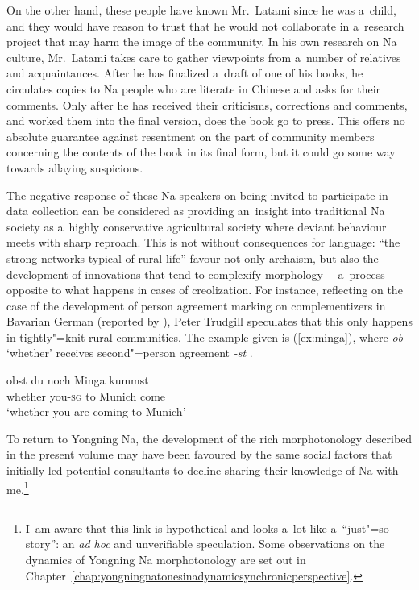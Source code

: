 On the other hand, these people have known Mr.\ Latami since he was a~child, and they would have
reason to trust that he would not collaborate in a~research project that may harm the image of the
community. In his own research on Na culture, Mr.\ Latami takes care to gather
viewpoints from a~number of relatives and acquaintances. After he has
finalized a~draft of one of his books, he circulates copies to Na people who are literate in Chinese and asks for their comments. Only after he
has received their criticisms, corrections and comments, and worked them into the final version,
does the book go to press. This offers no absolute guarantee against resentment on the part of 
community members concerning the contents of the book in its final form, but it could go some way
towards allaying suspicions.

The negative response of these Na speakers on being invited to participate in data collection can be considered as providing an~insight into traditional Na society as a~highly {conservative} agricultural society where deviant behaviour meets with sharp
reproach. This is not without consequences for language: “the strong networks typical of rural life” \citep[379]{milroyetal1985} favour not only archaism, but
also the development of innovations that tend to complexify morphology~-- a~process opposite to what
happens in cases of creolization. For instance, reflecting on the case of the development of person
agreement marking on complementizers in Bavarian German (reported by \citealt{bayer1984}), Peter
Trudgill speculates that this only happens in tightly"=knit rural communities. The example given is (\ref{ex:minga}), where \textit{ob} ‘whether’ receives second"=person agreement \textit{-st} \citep[82,
112--113]{trudgill2011}. 

\begin{exe}
  \ex
	 \label{ex:minga}
	 \gll {\dots} obst du noch Minga kummst\\
     {} whether you-\textsc{sg} to Munich come\\
     \glt ‘whether you are coming to Munich’
\end{exe}

To return to Yongning Na, the development of the rich morphotonology described in the present volume may have been favoured by the same social factors that
initially led potential consultants to decline sharing their knowledge of Na with me.\footnote{I~am aware that this link is hypothetical and looks a~lot like a~“just"=so story”: an \textit{ad hoc} and unverifiable speculation. Some observations on the dynamics of Yongning Na morphotonology are set out in Chapter~\ref{chap:yongningnatonesinadynamicsynchronicperspective}.}

